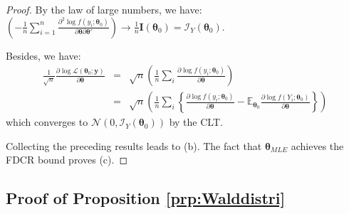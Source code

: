 \documentclass[
]{book}
\theoremstyle{definition}
\theoremstyle{definition}
\theoremstyle{definition}
\theoremstyle{definition}
\theoremstyle{remark}
\begin{document}
\begin{proof}
By the law of large numbers, we have: \(\left(- \frac{1}{n} \sum_{i=1}^n \frac{\partial^2 \log f(y_i;\boldsymbol\theta_0)}{\partial \boldsymbol\theta \partial \boldsymbol\theta'} \right) \overset{}\rightarrow \frac{1}{n} \mathbf{I}(\boldsymbol\theta_0) = \mathcal{I}_Y(\boldsymbol\theta_0)\).

Besides, we have:
\begin{eqnarray*}
\frac{1}{\sqrt{n}} \frac{\partial \log \mathcal{L}(\boldsymbol\theta_0;\mathbf{y})}{\partial \boldsymbol\theta} &=& \sqrt{n} \left( \frac{1}{n} \sum_i \frac{\partial \log f(y_i;\boldsymbol\theta_0)}{\partial \boldsymbol\theta} \right) \\
&=& \sqrt{n} \left( \frac{1}{n} \sum_i \left\{ \frac{\partial \log f(y_i;\boldsymbol\theta_0)}{\partial \boldsymbol\theta} - \mathbb{E}_{\boldsymbol\theta_0} \frac{\partial \log f(Y_i;\boldsymbol\theta_0)}{\partial \boldsymbol\theta} \right\} \right)
\end{eqnarray*}
which converges to \(\mathcal{N}(0,\mathcal{I}_Y(\boldsymbol\theta_0))\) by the CLT.

Collecting the preceding results leads to (b). The fact that \(\boldsymbol\theta_{MLE}\) achieves the FDCR bound proves (c).
\end{proof}

\hypertarget{Walddistri}{%
\subsection{Proof of Proposition \ref{prp:Walddistri}}\label{Walddistri}}
\end{document}
